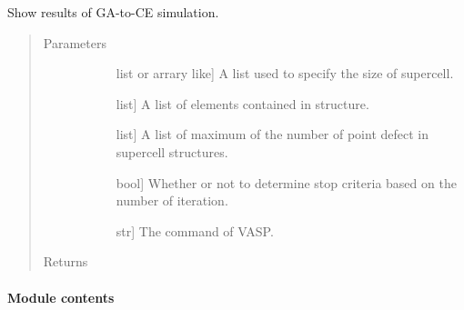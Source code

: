 \documentclass[letterpaper,10pt,english]{sphinxmanual}
\begin{document}

\begin{fulllineitems}
\label{\detokenize{pygace.scripts:pygace.scripts.rungace.show_results}}
Show results of GA-to-CE simulation.
\begin{quote}\begin{description}
\item[{Parameters}] \leavevmode\begin{description}
\item[{}] \leavevmode{[}list or arrary like{]}
A list used to specify the size of supercell.

\item[{}] \leavevmode{[}list{]}
A list of elements contained in structure.

\item[{}] \leavevmode{[}list{]}
A list of maximum of the number of point defect in supercell structures.

\item[{}] \leavevmode{[}bool{]}
Whether or not to determine stop criteria based on the number of iteration.

\item[{}] \leavevmode{[}str{]}
The command of VASP.

\end{description}

\item[{Returns}] \leavevmode\begin{description}
\item[{}] \leavevmode
\end{description}

\end{description}\end{quote}

\end{fulllineitems}



\paragraph{Module contents}
\label{\detokenize{pygace.scripts:module-pygace.scripts}}\label{\detokenize{pygace.scripts:module-contents}}
\end{document}
